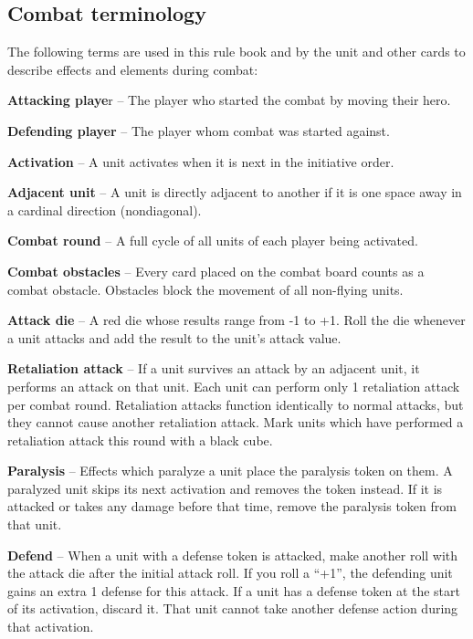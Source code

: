 \clearpage
\subsection*{\hypertarget{Combatterminology}{Combat terminology}}
The following terms are used in this rule book and by the unit and other cards to describe effects
and elements during combat:\par
\textbf{Attacking playe}r – The player who started the combat by moving their hero.\par
\textbf{Defending player} – The player whom combat was started against.\par
\textbf{Activation} – A unit activates when it is next in the initiative order.\par
\textbf{Adjacent unit} – A unit is directly adjacent to another if it is one space away in a cardinal direction (nondiagonal).\par
\textbf{Combat round} – A full cycle of all units of each player being activated.\par
\textbf{Combat obstacles} – Every card placed on the combat board counts as a combat obstacle.
Obstacles block the movement of all non-flying units.\par
\textbf{Attack die} – A red die whose results range from -1 to +1.
Roll the die whenever a unit attacks and
add the result to the unit’s attack value.\par
\textbf{\hypertarget{Retaliate}{Retaliation attack}} – If a unit survives an attack by an adjacent unit, it performs an attack on that unit.
Each unit can perform only 1 retaliation attack per combat round.
Retaliation attacks function identically to normal attacks, but they cannot cause another retaliation attack.
Mark units which have performed a retaliation attack this round with a black cube.\par

\textbf{Paralysis}  – Effects which paralyze a unit place the paralysis token on them.
A paralyzed unit
skips its next activation and removes the token instead.
If it is attacked or takes any damage before that time, remove the paralysis token from that unit.\par
\textbf{\hypertarget{Defend}{Defend}}  – When a unit with a defense token is attacked, make another roll with the attack die
after the initial attack roll.
If you roll a “+1”, the defending unit gains an extra 1 defense for this attack.
If a unit has a defense token at the start of its activation, discard it.
That unit cannot take another defense action during that activation.

